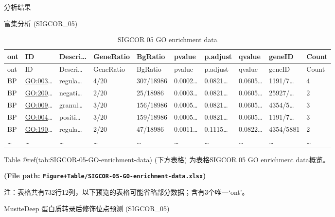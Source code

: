 \documentclass[
  ignorenonframetext,
]{beamer}
\begin{document}
\begin{frame}[fragile]{分析结果}
\begin{block}{富集分析 (SIGCOR\_05)}
\begin{center}\vspace{1.5cm}\end{center}

\begin{center}\vspace{1.5cm}\end{center}

\begin{longtable}[]{@{}llllllllll@{}}
\caption{SIGCOR 05 GO enrichment data}\tabularnewline
\toprule
ont & ID & Descri\ldots{} & GeneRatio & BgRatio & pvalue & p.adjust &
qvalue & geneID & Count\tabularnewline
\midrule
\endfirsthead
\toprule
ont & ID & Descri\ldots{} & GeneRatio & BgRatio & pvalue & p.adjust &
qvalue & geneID & Count\tabularnewline
\midrule
\endhead
BP & \url{GO:003}\ldots{} & regula\ldots{} & 4/20 & 307/18986 &
0.0002\ldots{} & 0.0821\ldots{} & 0.0605\ldots{} & 1191/7\ldots{} &
4\tabularnewline
BP & \url{GO:200}\ldots{} & negati\ldots{} & 2/20 & 25/18986 &
0.0003\ldots{} & 0.0821\ldots{} & 0.0605\ldots{} & 25927/\ldots{} &
2\tabularnewline
BP & \url{GO:009}\ldots{} & granul\ldots{} & 3/20 & 156/18986 &
0.0005\ldots{} & 0.0821\ldots{} & 0.0605\ldots{} & 4354/5\ldots{} &
3\tabularnewline
BP & \url{GO:004}\ldots{} & positi\ldots{} & 3/20 & 159/18986 &
0.0005\ldots{} & 0.0821\ldots{} & 0.0605\ldots{} & 1191/7\ldots{} &
3\tabularnewline
BP & \url{GO:190}\ldots{} & regula\ldots{} & 2/20 & 47/18986 &
0.0011\ldots{} & 0.1115\ldots{} & 0.0822\ldots{} & 4354/5881 &
2\tabularnewline
\ldots{} & \ldots{} & \ldots{} & \ldots{} & \ldots{} & \ldots{} &
\ldots{} & \ldots{} & \ldots{} & \ldots{}\tabularnewline
\bottomrule
\end{longtable}

Table @ref(tab:SIGCOR-05-GO-enrichment-data) (下方表格) 为表格SIGCOR 05
GO enrichment data概览。

\textbf{(File path:
\texttt{Figure+Table/SIGCOR-05-GO-enrichment-data.xlsx})}

\begin{center}\begin{tcolorbox}[colback=gray!10, colframe=gray!50, width=0.9\linewidth, arc=1mm, boxrule=0.5pt]注：表格共有732行12列，以下预览的表格可能省略部分数据；含有3个唯一`ont'。
\end{tcolorbox}
\end{center}

\begin{center}\vspace{1.5cm}\end{center}
\end{block}

\begin{block}{MusiteDeep 蛋白质转录后修饰位点预测 (SIGCOR\_05)}
\protect\hypertarget{musitedeep-ux86cbux767dux8d28ux8f6cux5f55ux540eux4feeux9970ux4f4dux70b9ux9884ux6d4b-sigcor_05}{}
\end{block}
\end{frame}
\end{document}
